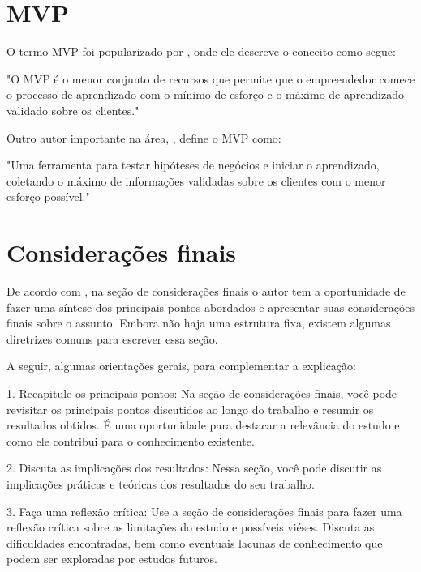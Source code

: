 \documentclass[
	article,			%
	12pt,				%
	oneside,			%
	a4paper,			%
    BIBLATEX,           %
	english,			%
	brazil,				%
	sumario=tradicional
	]{abntex2}
\begin{document}
\section{MVP}

O termo MVP foi popularizado por  , onde ele descreve o conceito como segue:

"O MVP é o menor conjunto de recursos que permite que o empreendedor comece o processo de aprendizado com o mínimo de esforço e o máximo de aprendizado validado sobre os clientes."

Outro autor importante na área, , define o MVP como:

"Uma ferramenta para testar hipóteses de negócios e iniciar o aprendizado, coletando o máximo de informações validadas sobre os clientes com o menor esforço possível."


% 

\section{Considerações finais}


De acordo com , na seção de considerações finais o autor tem a oportunidade de fazer uma síntese dos principais pontos abordados e apresentar suas considerações finais sobre o assunto. Embora não haja uma estrutura fixa, existem algumas diretrizes comuns para escrever essa seção.

A seguir, algumas orientações gerais, para complementar a explicação:

1. Recapitule os principais pontos: Na seção de considerações finais, você pode revisitar os principais pontos discutidos ao longo do trabalho e resumir os resultados obtidos. É uma oportunidade para destacar a relevância do estudo e como ele contribui para o conhecimento existente.

2. Discuta as implicações dos resultados: Nessa seção, você pode discutir as implicações práticas e teóricas dos resultados do seu trabalho. 

3. Faça uma reflexão crítica: Use a seção de considerações finais para fazer uma reflexão crítica sobre as limitações do estudo e possíveis viéses. Discuta as dificuldades encontradas, bem como eventuais lacunas de conhecimento que podem ser exploradas por estudos futuros.
\end{document}
